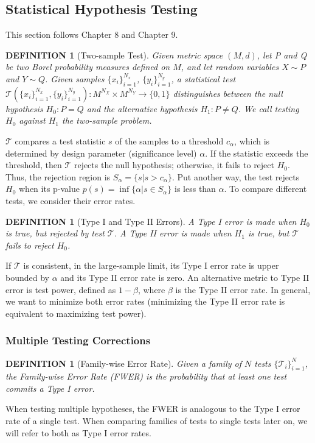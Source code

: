 \documentclass[a4paper,11pt]{article}
\newtheorem{definition}[theorem]{DEFINITION}
\begin{document}
\subsection{Statistical Hypothesis Testing}
This section follows \cite{casella_statistical_1990} Chapter 8 and \cite{lehmann_testing_2005} Chapter 9. 
\begin{definition}[Two-sample Test]
    Given metric space $(M, d)$, let P and Q be two Borel probability measures defined on $M$, and let random variables $X \sim P$ and $Y \sim Q$. Given samples $\{x_{i}\}_{i=1}^{N_{x}}$, $\{y_{i}\}_{i=1}^{N_{y}}$, a statistical test $\mathcal{T}(\{x_{i}\}_{i=1}^{N_{x}}, \{y_{i}\}_{i=1}^{N_{y}}): M^{N_{X}} \times M^{N_{Y}} \rightarrow \{0, 1\}$ distinguishes between the null hypothesis $H_{0}: P=Q$ and the alternative hypothesis $H_{1}: P \neq Q$. We call testing $H_{0}$ against $H_{1}$ the two-sample problem.
\end{definition}
$\mathcal{T}$ compares a test statistic $s$ of the samples to a threshold $c_{\alpha}$, which is determined by design parameter (significance level) $\alpha$. If the statistic exceeds the threshold, then $\mathcal{T}$ rejects the null hypothesis; otherwise, it fails to reject $H_{0}$. Thus, the rejection region is $S_{\alpha} = \{s | s > c_{\alpha}\}$. Put another way, the test rejects $H_{0}$ when its p-value $p(s)=\inf \{\alpha | s \in S_{\alpha}\}$ is less than $\alpha$. To compare different tests, we consider their error rates.
\begin{definition}[Type I and Type II Errors]
    A Type I error is made when $H_{0}$ is true, but rejected by test $\mathcal{T}$. A Type II error is made when $H_{1}$ is true, but $\mathcal{T}$ fails to reject $H_{0}$.
\end{definition}
If $\mathcal{T}$ is consistent, in the large-sample limit, its Type I error rate is upper bounded by $\alpha$ and its Type II error rate is zero. An alternative metric to Type II error is test power, defined as $1-\beta$, where $\beta$ is the Type II error rate. In general, we want to minimize both error rates (minimizing the Type II error rate is equivalent to maximizing test power).

\subsubsection{Multiple Testing Corrections}
\begin{definition}[Family-wise Error Rate]
    Given a family of $N$ tests $\{\mathcal{T}_{i}\}_{i=1}^{N}$, the Family-wise Error Rate (FWER) is the probability that at least one test commits a Type I error.
\end{definition}
When testing multiple hypotheses, the FWER is analogous to the Type I error rate of a single test. When comparing families of tests to single tests later on, we will refer to both as Type I error rates. 
\end{document}
